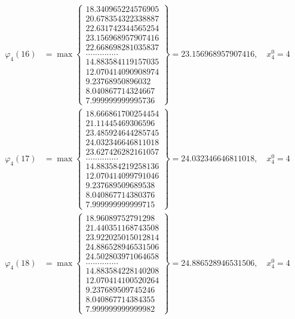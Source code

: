 \documentclass{article}
\begin{document}
\begin{align*}
  
  
  
\varphi_{4}(16) &= \max \left\{ \begin{array}{c}
18.340965224576905 \\
 20.678354322338887 \\
 22.631742344565254 \\
 23.156968957907416 \\
 22.668698281035837 \\
 .............. \\
 14.883584119157035 \\
 12.070414090908974 \\
 9.23768950896032 \\
 8.040867714324667 \\
 7.999999999995736
\end{array} \right\} = 23.156968957907416, \quad x_{4}^0 = 4\\
  
  
  
  
\varphi_{4}(17) &= \max \left\{ \begin{array}{c}
18.666861700254454 \\
 21.11445469306596 \\
 23.485924644285745 \\
 24.032346646811018 \\
 23.627426282161057 \\
 .............. \\
 14.883584219258136 \\
 12.070414099791046 \\
 9.237689509689538 \\
 8.040867714380376 \\
 7.999999999999715
\end{array} \right\} = 24.032346646811018, \quad x_{4}^0 = 4\\
  
  
  
  
\varphi_{4}(18) &= \max \left\{ \begin{array}{c}
18.96089752791298 \\
 21.440351168743508 \\
 23.922025015012814 \\
 24.886528946531506 \\
 24.502803971064658 \\
 .............. \\
 14.883584228140208 \\
 12.070414100520264 \\
 9.237689509745246 \\
 8.040867714384355 \\
 7.999999999999982
\end{array} \right\} = 24.886528946531506, \quad x_{4}^0 = 4\\
  

\end{align*}
\end{document}
